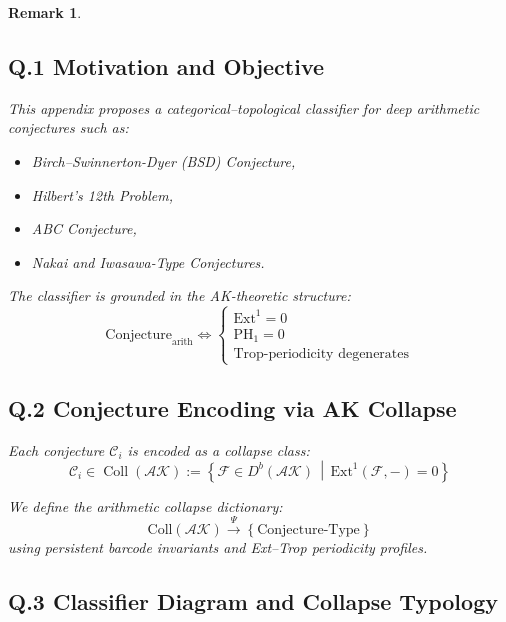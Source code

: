 \documentclass[11pt]{article}
\newtheorem{remark}[theorem]{Remark}
\begin{document}
\begin{remark}
\subsection*{Q.1 Motivation and Objective}

This appendix proposes a categorical–topological classifier for deep arithmetic conjectures such as:

\begin{itemize}
  \item Birch–Swinnerton-Dyer (BSD) Conjecture,
  \item Hilbert's 12th Problem,
  \item ABC Conjecture,
  \item Nakai and Iwasawa-Type Conjectures.
\end{itemize}

The classifier is grounded in the AK-theoretic structure:
\[
\mathrm{Conjecture}_{\mathrm{arith}} \Longleftrightarrow 
\left\{
  \begin{array}{l}
    \mathrm{Ext}^1 = 0 \\
    \mathrm{PH}_1 = 0 \\
    \text{Trop-periodicity degenerates}
  \end{array}
\right.
\]

\subsection*{Q.2 Conjecture Encoding via AK Collapse}

Each conjecture \( \mathcal{C}_i \) is encoded as a collapse class:
\[
\mathcal{C}_i \in \operatorname{Coll}(\mathcal{AK}) := 
\left\{ \mathcal{F} \in D^b(\mathcal{AK}) \,\middle|\, \mathrm{Ext}^1(\mathcal{F}, -) = 0 \right\}
\]

We define the arithmetic collapse dictionary:
\[
\mathrm{Coll}(\mathcal{AK}) \xrightarrow{\Psi} \left\{ \text{Conjecture-Type} \right\}
\]
using persistent barcode invariants and Ext–Trop periodicity profiles.

\subsection*{Q.3 Classifier Diagram and Collapse Typology}

\vspace{1em}
\begin{center}
\end{center}
\vspace{1em}


\end{remark}
\end{document}
